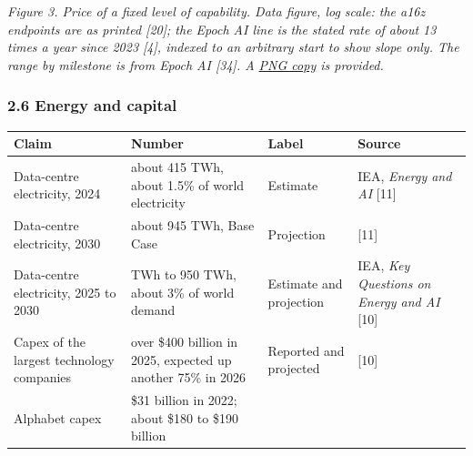 \documentclass[
  10pt,
]{article}
\newcounter{none} %
\begin{document}
\emph{Figure 3. Price of a fixed level of capability. Data figure, log
scale: the a16z endpoints are as printed {[}20{]}; the Epoch AI line is
the stated rate of about 13 times a year since 2023 {[}4{]}, indexed to
an arbitrary start to show slope only. The range by milestone is from
Epoch AI {[}34{]}. A
\href{https://research.openie.dev/figures/ai-coding-market/price-trend.png}{PNG
copy} is provided.}

\subsubsection{2.6 Energy and capital}\label{energy-and-capital}

{\def\LTcaptype{none} %
\begin{longtable}[]{@{}
  >{\raggedright\arraybackslash}p{}
  >{\raggedright\arraybackslash}p{}
  >{\raggedright\arraybackslash}p{}
  >{\raggedright\arraybackslash}p{}@{}}
\toprule\noalign{}
\begin{minipage}[b]{\linewidth}\raggedright
Claim
\end{minipage} & \begin{minipage}[b]{\linewidth}\raggedright
Number
\end{minipage} & \begin{minipage}[b]{\linewidth}\raggedright
Label
\end{minipage} & \begin{minipage}[b]{\linewidth}\raggedright
Source
\end{minipage} \\
\midrule\noalign{}
\endhead
\bottomrule\noalign{}
\endlastfoot
Data-centre electricity, 2024 & about 415 TWh, about 1.5\% of world
electricity & Estimate & IEA, \emph{Energy and AI} {[}11{]} \\
Data-centre electricity, 2030 & about 945 TWh, Base Case & Projection &
{[}11{]} \\
Data-centre electricity, 2025 to 2030 & 485 TWh to 950 TWh, about 3\% of
world demand & Estimate and projection & IEA, \emph{Key Questions on
Energy and AI} {[}10{]} \\
Capex of the largest technology companies & over \$400 billion in 2025,
expected up another 75\% in 2026 & Reported and projected & {[}10{]} \\
Alphabet capex & \$31 billion in 2022; about \$180 to \$190 billion

\end{longtable}}
\end{document}

